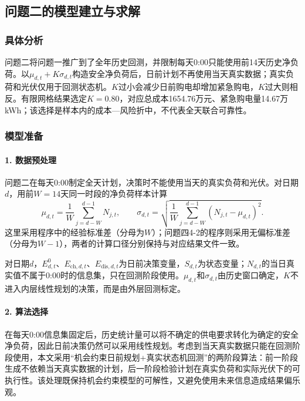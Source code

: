 \documentclass{cumcmthesis}
\begin{document}
\subsection{问题二的模型建立与求解}

\subsubsection{具体分析}

问题二将问题一推广到了全年历史回测，并限制每天0:00只能使用前14天历史净负荷。以$\mu_{d,t}+K\sigma_{d,t}$构造安全净负荷后，日前计划不再使用当天真实数据；真实负荷和光伏仅用于回测状态机。$K$过小会减少日前购电却增加紧急购电，$K$过大则相反。有限网格结果选定$K=0.80$，对应总成本1654.76万元、紧急购电量14.67万kWh；该选择是样本内的成本—风险折中，不代表全天联合可靠性。

\subsubsection{模型准备}

\paragraph{1. 数据预处理}

问题二在每天0:00制定全天计划，决策时不能使用当天的真实负荷和光伏。对日期$d$，用前$W=14$天同一时段的净负荷样本计算
\begin{equation}
\mu_{d,t}=\frac{1}{W}\sum_{j=d-W}^{d-1}N_{j,t},\qquad
\sigma_{d,t}=\sqrt{\frac{1}{W}\sum_{j=d-W}^{d-1}(N_{j,t}-\mu_{d,t})^2}.
\tag{10}
\end{equation}
这里采用程序中的经验标准差（分母为$W$）；问题四4-2的程序则采用无偏标准差（分母为$W-1$），两者的计算口径分别保持与对应结果文件一致。

对日期$d$，$E^0_{d,t}$、$E_{\mathrm{ch},d,t}$、$E_{\mathrm{dis},d,t}$为日前决策变量，$S_{d,t}$为状态变量；$N_{d,t}$的当日真实值不属于0:00时的信息集，只在回测阶段使用。$\mu_{d,t}$和$\sigma_{d,t}$由历史窗口确定，$K$不进入内层线性规划的决策，而是由外层回测标定。

\paragraph{2. 算法选择}

在每天0:00信息集固定后，历史统计量可以将不确定的供电要求转化为确定的安全净负荷，因此日前决策仍然可以采用线性规划。考虑到当天真实数据只能在回测阶段使用，本文采用“机会约束日前规划+真实状态机回测”的两阶段算法：前一阶段生成不依赖当天真实数据的计划，后一阶段检验计划在真实负荷和实际光伏下的可执行性。该处理既保持机会约束模型的可解性，又避免使用未来信息造成结果偏乐观。
\end{document}
